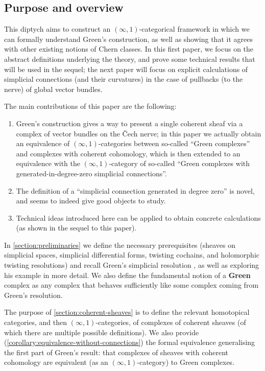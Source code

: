 \documentclass[11pt,fleqn]{article}
\theoremstyle{plain}
\theoremstyle{definition}
\theoremstyle{remark}
\numberwithin{equation}{theorem}
\newcommand{\define}[1]{\textbf{#1}}
\begin{document}
    \subsection{Purpose and overview}

    This diptych aims to construct an $(\infty,1)$-categorical framework in which we can formally understand Green's construction, as well as showing that it agrees with other existing notions of Chern classes.
    In this first paper, we focus on the abstract definitions underlying the theory, and prove some technical results that will be used in the sequel; the next paper will focus on explicit calculations of simplicial connections (and their curvatures) in the case of pullbacks (to the nerve) of global vector bundles.

    \medskip

    The main contributions of this paper are the following:
    \begin{enumerate}
        \item Green's construction gives a way to present a single coherent sheaf via a complex of vector bundles on the Čech nerve; in this paper we actually obtain an equivalence of $(\infty,1)$-categories between so-called ``Green complexes'' and complexes with coherent cohomology, which is then extended to an equivalence with the $(\infty,1)$-category of so-called ``Green complexes with generated-in-degree-zero simplicial connections''.
        \item The definition of a ``simplicial connection generated in degree zero'' is novel, and seems to indeed give good objects to study.
        \item Technical ideas introduced here can be applied to obtain concrete calculations (as shown in the sequel to this paper).
    \end{enumerate}

    \medskip

    In \cref{section:preliminaries} we define the necessary prerequisites (sheaves on simplicial spaces, simplicial differential forms, twisting cochains, and holomorphic twisting resolutions) and recall Green's simplicial resolution \cite[§1.4]{Green1980}, as well as exploring his example \cite[pp.~41-42]{Green1980} in more detail.
    We also define the fundamental notion of a \define{Gre{}en} complex as any complex that behaves sufficiently like some complex coming from Green's resolution.

    The purpose of \cref{section:coherent-sheaves} is to define the relevant homotopical categories, and then $(\infty,1)$-categories, of complexes of coherent sheaves (of which there are multiple possible definitions).
    We also provide (\cref{corollary:equivalence-without-connections}) the formal equivalence generalising the first part of Green's result: that complexes of sheaves with coherent cohomology are equivalent (as an $(\infty,1)$-category) to Green complexes.
\end{document}
